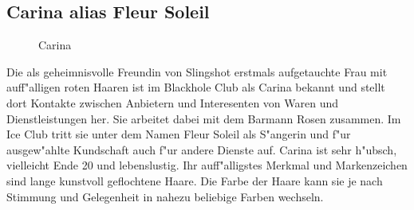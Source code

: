 \subsection{Carina alias Fleur Soleil}

\begin{figure}
    \caption{Carina}
\end{figure}

Die als geheimnisvolle Freundin von Slingshot erstmals aufgetauchte Frau mit auff"alligen roten Haaren ist im Blackhole Club als Carina bekannt und stellt dort Kontakte zwischen Anbietern und Interesenten von Waren und Dienstleistungen her. Sie arbeitet dabei mit dem Barmann Rosen zusammen. Im Ice Club tritt sie unter dem Namen Fleur Soleil als S"angerin und f"ur ausgew"ahlte Kundschaft auch f"ur andere Dienste auf. Carina ist sehr h"ubsch, vielleicht Ende 20 und lebenslustig. Ihr auff"alligstes Merkmal und Markenzeichen sind lange kunstvoll geflochtene Haare. Die Farbe der Haare kann sie je nach Stimmung und Gelegenheit in nahezu beliebige Farben wechseln.

